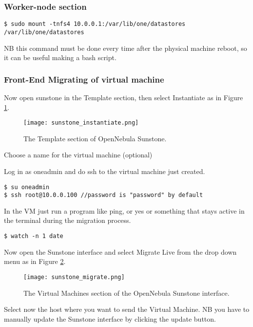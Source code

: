 \documentclass[11pt,a4paper]{article}
\begin{document}
\subsubsection{Worker-node section}

\begin{lstlisting}
$ sudo mount -tnfs4 10.0.0.1:/var/lib/one/datastores /var/lib/one/datastores
\end{lstlisting}

NB this command must be done every time after the physical machine reboot, so it can be useful making a bash script.

\subsubsection{Front-End Migrating of virtual machine}
Now open sunstone in the Template section, then select Instantiate as in Figure \ref{fig:sunstone instantiate}.
\begin{figure}[ht]
\centering
\texttt{[image: sunstone\_instantiate.png]}
\caption{\label{fig:sunstone instantiate} The Template section of OpenNebula Sunstone.}
\end{figure}

Choose a name for the virtual machine (optional) 

Log in as oneadmin and do ssh to the virtual machine just created.
\begin{lstlisting}
$ su oneadmin
$ ssh root@10.0.0.100 //password is "password" by default
\end{lstlisting}

In the VM just run a program like ping, or yes or something that stays active in the terminal during the migration process.
\begin{lstlisting}
$ watch -n 1 date
\end{lstlisting}

Now open the Sunstone interface and select Migrate Live from the drop down menu as in Figure \ref{fig:sunstone migrate}.

\begin{figure}[ht]
\centering
\texttt{[image: sunstone\_migrate.png]}
\caption{\label{fig:sunstone migrate} The Virtual Machines section of the OpenNebula Sunstone interface.}
\end{figure}

Select now the host where you want to send the Virtual Machine.
NB you have to manually update the Sunstone interface by clicking the update button.
\end{document}
